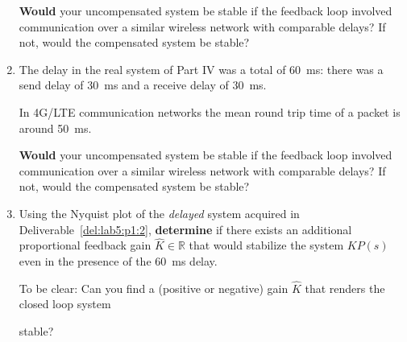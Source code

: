 \begin{deliverable}[label={lab5:report}]
\begin{enumerate}[label={(\arabic*)}]
{      \textbf{Would} your uncompensated system be stable if the feedback loop involved communication over a similar wireless network with comparable delays?
      If not, would the compensated system be stable?
      \label{lab5:report:q5}
    }
    \item{%
      The delay in the real system of Part IV was a total of \SI{60}{\milli\second}:
      there was a send delay of \SI{30}{\milli\second} and a receive delay of \SI{30}{\milli\second}.

      In 4G/LTE communication networks the mean round trip time of a packet is around \SI{50}{\milli\second}.

      \textbf{Would} your uncompensated system be stable if the feedback loop involved communication over a similar wireless network with comparable delays?
      If not, would the compensated system be stable?
      \label{lab5:report:q6}
    }
    \item{%
      Using the Nyquist plot of the \emph{delayed} system acquired in Deliverable~\ref{del:lab5:p1:2}, \textbf{determine} if there exists an additional proportional feedback gain \(\hat{K} \in \mathbb{R}\) that would stabilize the system \(K P(s)\) even in the presence of the \SI{60}{\milli\second} delay.

      To be clear: Can you find a (positive or negative) gain \(\hat{K}\) that renders the closed loop system
      \begin{center}
      \end{center}
      stable?

}
\end{enumerate}
\end{deliverable}
